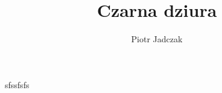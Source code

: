 \documentclass[12pt]{article}
\title{Czarna dziura}
\author{Piotr Jadczak}
\begin{document}
sfssfsfs
\end{document}
